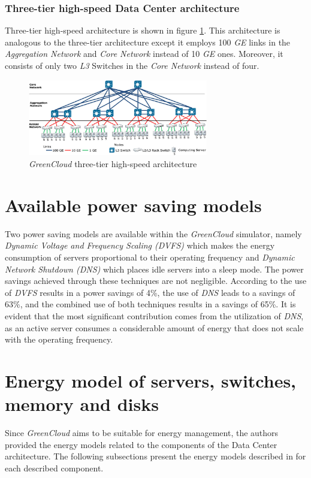 \subsubsection{Three-tier high-speed Data Center architecture}
Three-tier high-speed architecture is shown in figure \ref{fig:greencloud_threetierhs}. This architecture is analogous to the three-tier architecture except it employs 100 \emph{GE} links in the \emph{Aggregation Network} and \emph{Core Network} instead of 10 \emph{GE} ones. Moreover, it consists of only two \emph{L3} Switches in the \emph{Core Network} instead of four.
\begin{figure}[h]
    \centering
    \includegraphics[width=0.7\textwidth]{chapters/images/greencloud_threetierhs.png}
    \caption{\emph{GreenCloud} three-tier high-speed architecture}
    \label{fig:greencloud_threetierhs}
\end{figure}

\section{Available power saving models}
Two power saving models are available within the \emph{GreenCloud} simulator, namely \emph{Dynamic Voltage and Frequency Scaling (DVFS)} which makes the energy consumption of servers proportional to their operating frequency and \emph{Dynamic Network Shutdown (DNS)} which places idle servers into a sleep mode. The power savings achieved through these techniques are not negligible. According to \cite{kliazovich2012greencloud} the use of \emph{DVFS} results in a power savings of 4\%, the use of \emph{DNS} leads to a savings of 63\%, and the combined use of both techniques results in a savings of 65\%. It is evident that the most significant contribution comes from the utilization of \emph{DNS}, as an active server consumes a considerable amount of energy that does not scale with the operating frequency.

\section{Energy model of servers, switches, memory and disks}
Since \emph{GreenCloud} aims to be suitable for energy management, the authors provided the energy models related to the components of the Data Center architecture. The following subsections present the energy models described in \cite{kliazovich2012greencloud} for each described component.
